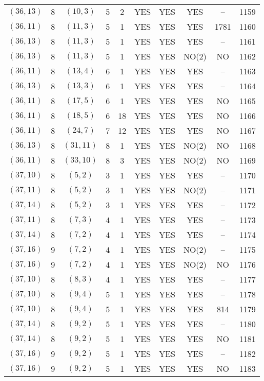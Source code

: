 \begin{longtable}{|c|c|c|c|c|c|c|c|c|c|}
$(36, 13)$ & 8 & $(10, 3)$ & 5 & 2 & YES & YES & YES & -- & 1159\\
$(36, 11)$ & 8 & $(11, 3)$ & 5 & 1 & YES & YES & YES & 1781 & 1160\\
$(36, 13)$ & 8 & $(11, 3)$ & 5 & 1 & YES & YES & YES & -- & 1161\\
$(36, 13)$ & 8 & $(11, 3)$ & 5 & 1 & YES & YES & NO(2) & NO & 1162\\
$(36, 11)$ & 8 & $(13, 4)$ & 6 & 1 & YES & YES & YES & -- & 1163\\
$(36, 13)$ & 8 & $(13, 3)$ & 6 & 1 & YES & YES & YES & -- & 1164\\
$(36, 11)$ & 8 & $(17, 5)$ & 6 & 1 & YES & YES & YES & NO & 1165\\
$(36, 11)$ & 8 & $(18, 5)$ & 6 & 18 & YES & YES & YES & NO & 1166\\
$(36, 11)$ & 8 & $(24, 7)$ & 7 & 12 & YES & YES & YES & NO & 1167\\
$(36, 13)$ & 8 & $(31, 11)$ & 8 & 1 & YES & YES & NO(2) & NO & 1168\\
$(36, 11)$ & 8 & $(33, 10)$ & 8 & 3 & YES & YES & NO(2) & NO & 1169\\
$(37, 10)$ & 8 & $(5, 2)$ & 3 & 1 & YES & YES & YES & -- & 1170\\
$(37, 11)$ & 8 & $(5, 2)$ & 3 & 1 & YES & YES & NO(2) & -- & 1171\\
$(37, 14)$ & 8 & $(5, 2)$ & 3 & 1 & YES & YES & YES & -- & 1172\\
$(37, 11)$ & 8 & $(7, 3)$ & 4 & 1 & YES & YES & YES & -- & 1173\\
$(37, 14)$ & 8 & $(7, 2)$ & 4 & 1 & YES & YES & YES & -- & 1174\\
$(37, 16)$ & 9 & $(7, 2)$ & 4 & 1 & YES & YES & NO(2) & -- & 1175\\
$(37, 16)$ & 9 & $(7, 2)$ & 4 & 1 & YES & YES & NO(2) & NO & 1176\\
$(37, 10)$ & 8 & $(8, 3)$ & 4 & 1 & YES & YES & YES & -- & 1177\\
$(37, 10)$ & 8 & $(9, 4)$ & 5 & 1 & YES & YES & YES & -- & 1178\\
$(37, 10)$ & 8 & $(9, 4)$ & 5 & 1 & YES & YES & YES & 814 & 1179\\
$(37, 14)$ & 8 & $(9, 2)$ & 5 & 1 & YES & YES & YES & -- & 1180\\
$(37, 14)$ & 8 & $(9, 2)$ & 5 & 1 & YES & YES & YES & NO & 1181\\
$(37, 16)$ & 9 & $(9, 2)$ & 5 & 1 & YES & YES & YES & -- & 1182\\
$(37, 16)$ & 9 & $(9, 2)$ & 5 & 1 & YES & YES & YES & NO & 1183\\

\end{longtable}
